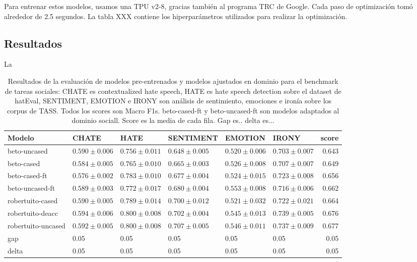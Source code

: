Para entrenar estos modelos, usamos una TPU v2-8, gracias también al programa TRC de Google. Cada paso de optimización tomó alrededor de 2.5 segundos. La tabla XXX contiene los hiperparámetros utilizados para realizar la optimización.

\subsection{Resultados}

La

\begin{table}[ht]
    \centering
    \footnotesize
    \begin{tabular}{llllllr}
        \toprule
        Modelo             & CHATE                   &  HATE              &  SENTIMENT        &  EMOTION          &  IRONY            &     score \\
        \midrule
        beto-uncased       & $0.590 \pm 0.006$ & $0.756 \pm 0.011$ &  $0.648 \pm 0.005$ &  $0.520 \pm 0.006$ & $0.703 \pm 0.007$ &  0.643 \\
        beto-cased         & $0.584 \pm 0.005$ & $0.765 \pm 0.010$ &  $0.665 \pm 0.003$ &  $0.526 \pm 0.008$ & $0.707 \pm 0.007$ &  0.649 \\
        beto-cased-ft      & $0.576 \pm 0.002$ & $0.783 \pm 0.010$ &  $0.677 \pm 0.004$ &  $0.524 \pm 0.015$ & $0.723 \pm 0.008$ &  0.656 \\
        beto-uncased-ft    & $0.589 \pm 0.003$ & $0.772 \pm 0.017$ &  $0.680 \pm 0.004$ &  $0.553 \pm 0.008$ & $0.716 \pm 0.006$ &  0.662 \\
        robertuito-cased   & $0.590 \pm 0.005$ & $0.789 \pm 0.014$ &  $0.700 \pm 0.012$ &  $0.521 \pm 0.032$ & $0.722 \pm 0.021$ &  0.664 \\
        robertuito-deacc   & $0.594 \pm 0.006$ & $0.800 \pm 0.008$ &  $0.702 \pm 0.004$ &  $0.545 \pm 0.013$ & $0.739 \pm 0.005$ &  0.676 \\
        robertuito-uncased & $0.592 \pm 0.005$ & $0.800 \pm 0.008$ &  $0.707 \pm 0.005$ &  $0.546 \pm 0.011$ & $0.737 \pm 0.009$ &  0.677 \\
        gap                & 0.05              & 0.05              & 0.05               & 0.05               & 0.05              & 0.05 \\
        delta              & 0.05              & 0.05              &  0.05              &  0.05              &  0.05             &  0.05 \\
        \bottomrule
    \end{tabular}
    \caption{Resultados de la evaluación de modelos pre-entrenados y modelos ajustados en dominio para el benchmark de tareas sociales: CHATE es contextualized hate speech, HATE es hate speech detection sobre el dataset de hatEval, SENTIMENT, EMOTION e IRONY son análisis de sentimiento, emociones e ironía sobre los corpus de TASS. Todos los scores son Macro F1s. beto-cased-ft y beto-uncased-ft son modelos adaptados al dominio sociall. Score es la media de cada fila. Gap es.. delta es...}

    \label{tab:domain_adaptation_evaluation_results}

\end{table}


